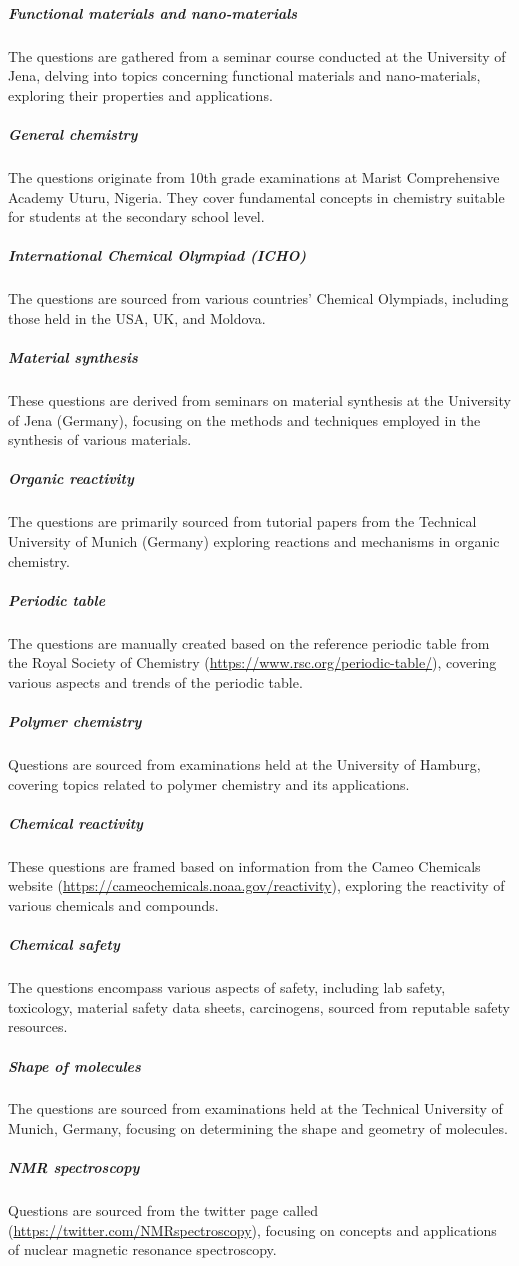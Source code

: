 \documentclass[11pt, oneside]{article}
\begin{document}
\subparagraph{Functional materials and nano-materials}
The questions are gathered from a seminar course conducted at the University of Jena, delving into topics concerning functional materials and nano-materials, exploring their properties and applications.

\subparagraph{General chemistry}
The questions originate from 10th grade examinations at Marist Comprehensive Academy Uturu, Nigeria. They cover fundamental concepts in chemistry suitable for students at the secondary school level.

\subparagraph{International Chemical Olympiad (\gls{ICHO})}
The questions are sourced from various countries' Chemical Olympiads, including those held in the USA, UK, and Moldova.

\subparagraph{Material synthesis}
These questions are derived from seminars on material synthesis at the University of Jena (Germany), focusing on the methods and techniques employed in the synthesis of various materials.

\subparagraph{Organic reactivity}
The questions are primarily sourced from tutorial papers from the Technical University of Munich (Germany) exploring reactions and mechanisms in organic chemistry.

\subparagraph{Periodic table}
The questions are manually created based on the reference periodic table from the Royal Society of Chemistry (\url{https://www.rsc.org/periodic-table/}), covering various aspects and trends of the periodic table.

\subparagraph{Polymer chemistry}
Questions are sourced from examinations held at the University of Hamburg, covering topics related to polymer chemistry and its applications.

\subparagraph{Chemical reactivity}
These questions are framed based on information from the Cameo Chemicals website (\url{https://cameochemicals.noaa.gov/reactivity}), exploring the reactivity of various chemicals and compounds.

\subparagraph{Chemical safety}
The questions encompass various aspects of safety, including lab safety, toxicology, material safety data sheets, carcinogens, sourced from reputable safety resources.

\subparagraph{Shape of molecules}
The questions are sourced from examinations held at the Technical University of Munich, Germany, focusing on determining the shape and geometry of molecules.

\subparagraph{\gls{NMR} spectroscopy}
Questions are sourced from the twitter page called (\url{https://twitter.com/NMRspectroscopy}), focusing on concepts and applications of nuclear magnetic resonance spectroscopy.
\end{document}
